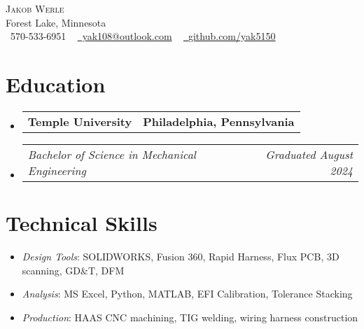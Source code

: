 \documentclass[letterpaper,11pt]{article}
\makeatletter
\newcommand{\company}[2]{
  \vspace{-2pt}\item
  \begin{tabular*}{1.0\textwidth}[t]{l@{\extracolsep{\fill}}r}
    \textbf{#1} & \textbf{\small #2} \\
  \end{tabular*}\vspace{-18pt}
}
\newcommand{\role}[2]{
  \vspace{-5pt}\item
  \begin{tabular*}{1.0\textwidth}[t]{l@{\extracolsep{\fill}}r}
    \textit{\small#1} & \textit{\small #2} \\
  \end{tabular*}\vspace{-20pt}
}
\newcommand{\resumeItemListStart}{
  \begin{itemize}[label=\tiny$\bullet$, leftmargin=0.25in] %
}
\newcommand{\resumeItemListEnd}{
  \end{itemize}\vspace{-5pt}
}
\newcommand{\resumeItem}[1]{
  \item\small{#1 \vspace{-2pt}}
}
\newcommand{\companyListStart}{
  \begin{itemize}[leftmargin=0.0in, label={}]
}
\newcommand{\companyListEnd}{
  \end{itemize}
}
\makeatother
\begin{document}
\begin{center}
    {\Huge \scshape Jakob Werle} \\ \vspace{1pt}
    Forest Lake, Minnesota \\ \vspace{1pt}
    \small \raisebox{-0.1\height}\faPhone\ 570-533-6951 ~ \href{mailto:jakob.werle@temple.edu}{\raisebox{-0.2\height}\faEnvelope\ yak108@outlook.com} ~ 
    \href{https://github.com/yak5150}{\raisebox{-0.2\height}\faGithub\ \underline{github.com/yak5150}}
    \vspace{-8pt}
\end{center}

\section{Education}
  \companyListStart
    \company{Temple University}{Philadelphia, Pennsylvania}
      \role{Bachelor of Science in Mechanical Engineering}{Graduated August 2024}
  \companyListEnd
\vspace{-12pt}

\section{Technical Skills}
    \resumeItemListStart
        \resumeItem{\textit{Design Tools}{: SOLIDWORKS, Fusion 360, Rapid Harness, Flux PCB, 3D scanning, GD\&T}, DFM} \vspace{-5pt}
        \resumeItem{\textit{Analysis}{: MS Excel, Python, MATLAB, EFI Calibration, Tolerance Stacking}}
        \vspace{-5pt}
        \resumeItem{\textit{Production}{: HAAS CNC machining, TIG welding, wiring harness construction}}
    \resumeItemListEnd
 \vspace{-16pt}

\end{document}
